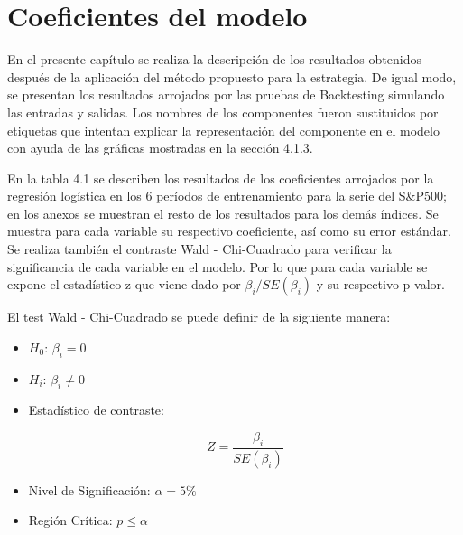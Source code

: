 \documentclass[a4paper,12pt]{Latex/Classes/PhDthesisPSnPDF}
\begin{document}
\newpage

\section{Coeficientes del modelo}

En el presente capítulo se realiza la descripción de los resultados obtenidos después de la aplicación del método propuesto para la estrategia. De igual modo, se presentan los resultados arrojados por las pruebas de Backtesting simulando las entradas y salidas. Los nombres de los componentes fueron sustituidos por etiquetas que intentan explicar la representación del componente en el modelo con ayuda de las gráficas mostradas en la sección 4.1.3.




% 

En la tabla 4.1 se describen los resultados de los coeficientes arrojados por la regresión logística en los 6 períodos de entrenamiento para la serie del S\&P500; en los anexos se muestran el resto de los resultados para los demás índices. Se muestra para cada variable su respectivo coeficiente, así como su error estándar. Se realiza también el contraste Wald - Chi-Cuadrado para verificar la significancia de cada variable en el modelo. Por lo que para cada variable se expone el estadístico z que viene dado por $\beta_{i}/SE(\beta_{i})$ y su respectivo p-valor.

El test Wald - Chi-Cuadrado se puede definir de la siguiente manera:

\begin{itemize}
\item \textbf{$H_{0}$}: $\beta_{i} = 0$
\item \textbf{$H_{i}$}: $\beta_{i} \neq 0$
\item Estadístico de contraste: 

$$Z = \frac{\beta_{i}}{SE(\beta_{i})}$$

\item Nivel de Significación: $\alpha = 5\%$
\item Región Crítica: $p \leq \alpha$
\end{itemize}
\end{document}
